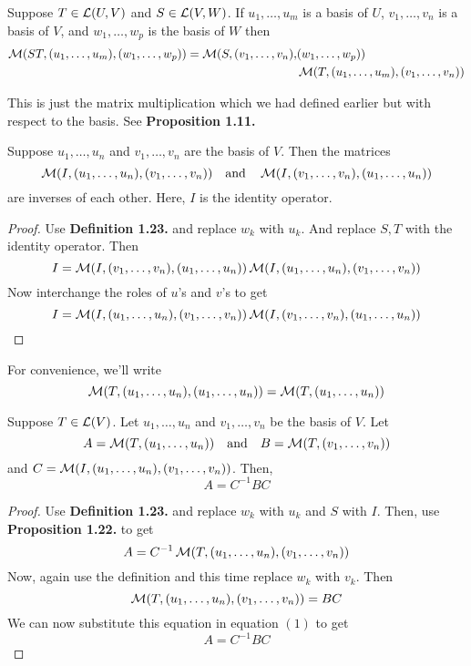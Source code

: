 \begin{definition}
    Suppose $T \in \operatorname{\mathcal{L}}(U,V)$ and $S \in \operatorname{\mathcal{L}}(V,W)$. If $u_1, \ldots, u_m$ is a basis of $U$, $v_1, \ldots, v_n$ is a basis of $V$, and 
    $w_1, \ldots, w_p$ is the basis of $W$ then
    \begin{align*}
        \operatorname{\mathcal{M}}(ST,(u_1, \ldots, u_m),(w_1, \ldots, w_p)) = \operatorname{\mathcal{M}}(S,(v_1,\ldots,v_n),&(w_1, \ldots, w_p)) \\
        &\operatorname{\mathcal{M}}(T,(u_1,\ldots,u_m),(v_1, \ldots, v_n) ) 
    \end{align*}
\end{definition}

This is just the matrix multiplication which we had defined earlier but with respect to the basis. See \textbf{Proposition 1.11.}


\begin{proposition}
    Suppose $u_1, \ldots, u_n$ and $v_1, \ldots, v_n$ are the basis of $V$. Then the matrices 
    \[ \operatorname{\mathcal{M}}(I,(u_1,\ldots,u_n),(v_1,\ldots,v_n)) \quad \text{and} \quad \operatorname{\mathcal{M}}(I,(v_1,\ldots,v_n),(u_1,\ldots,u_n)) \]
    are inverses of each other. Here, $I$ is the identity operator.
\end{proposition}

\begin{proof}
    Use \textbf{Definition 1.23.} and replace $w_k$ with $u_k$. And replace $S,T$ with the identity operator. Then
    \[ I = \operatorname{\mathcal{M}}(I,(v_1,\ldots,v_n),(u_1,\ldots,u_n)) \operatorname{\mathcal{M}}(I,(u_1,\ldots,u_n),(v_1,\ldots,v_n)) \]
    Now interchange the roles of $u$'s and $v$'s to get
    \[ I = \operatorname{\mathcal{M}}(I,(u_1,\ldots,u_n),(v_1,\ldots,v_n)) \operatorname{\mathcal{M}}(I,(v_1,\ldots,v_n),(u_1,\ldots,u_n)) \]
\end{proof}

\begin{remark}
    For convenience, we'll write
    \[ \operatorname{\mathcal{M}}(T,(u_1,\ldots,u_n),(u_1,\ldots,u_n)) = \operatorname{\mathcal{M}}(T,(u_1,\ldots,u_n)) \] 
\end{remark}

\begin{proposition}
    Suppose $T \in \operatorname{\mathcal{L}}(V)$. Let $u_1, \ldots, u_n$ and $v_1, \ldots, v_n$ be the basis of $V$. Let 
    \[ A = \operatorname{\mathcal{M}}(T,(u_1,\ldots,u_n)) \quad \text{and} \quad B = \operatorname{\mathcal{M}}(T,(v_1, \ldots, v_n)) \]
    and $C=\operatorname{\mathcal{M}}(I,(u_1,\ldots,u_n),(v_1,\ldots,v_n))$. Then,
    \[ A = C^{-1} BC \]
\end{proposition}

\begin{proof}
    Use \textbf{Definition 1.23.} and replace $w_k$ with $u_k$ and $S$ with $I$. Then, use \newline \textbf{Proposition 1.22.} to get
    \begin{equation}
        A = C^{-1} \operatorname{\mathcal{M}}(T,(u_1,\ldots,u_n),(v_1,\ldots,v_n))
    \end{equation}
    Now, again use the definition and this time replace $w_k$ with $v_k$. Then
    \[ \operatorname{\mathcal{M}}(T,(u_1,\ldots,u_n),(v_1,\ldots,v_n)) = BC \]
    We can now substitute this equation in equation $(1)$ to get 
    \[ A = C^{-1}BC \]
\end{proof}


